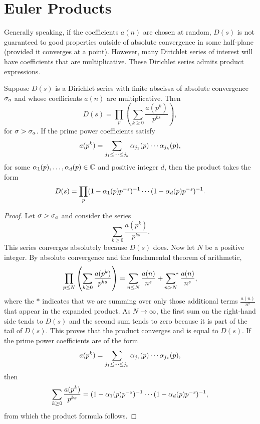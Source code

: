   \section{Euler Products}
    Generally speaking, if the coefficients \(a(n)\) are chosen at random, \(D(s)\) is not guaranteed to good properties outside of absolute convergence in some half-plane (provided it converges at a point). However, many Dirichlet series of interest will have coefficients that are multiplicative. These Dirichlet series admits product expressions.

    \begin{proposition}\label{prop:Dirichlet_series_Euler_product}
      Suppose \(D(s)\) is a Dirichlet series with finite abscissa of absolute convergence \(\sigma_{a}\) and whose coefficients \(a(n)\) are multiplicative. Then
      \[
        D(s) = \prod_{p}\left(\sum_{k \ge 0}\frac{a(p^{k})}{p^{ks}}\right),
      \]
      for \(\sigma > \sigma_{a}\). If the prime power coefficients satisfy
      \[
        a(p^{k}) = \sum_{j_{1} \le \cdots \le j_{k}}\alpha_{j_{1}}(p) \cdots \alpha_{j_{k}}(p),
      \]
      for some \(\alpha_{1}(p),\ldots,\alpha_{d}(p) \in \mathbb{C}\) and positive integer \(d\), then the product takes the form
      \[
        D(s) = \prod_{p}(1-\alpha_{1}(p)p^{-s})^{-1} \cdots (1-\alpha_{d}(p)p^{-s})^{-1}.
      \]
    \end{proposition}
    \begin{proof}
      Let \(\sigma > \sigma_{a}\) and consider the series
      \[
        \sum_{k \ge 0}\frac{a(p^{k})}{p^{ks}}.
      \]
      This series converges absolutely because \(D(s)\) does. Now let \(N\) be a positive integer. By absolute convergence and the fundamental theorem of arithmetic,
      \[
        \prod_{p \le N}\left(\sum_{k \ge 0}\frac{a(p^{k})}{p^{ks}}\right) = \sum_{n \le N}\frac{a(n)}{n^{s}}+\sideset{}{^{\ast}}\sum_{n > N}\frac{a(n)}{n^{s}},
      \]
      where the \(\ast\) indicates that we are summing over only those additional terms \(\frac{a(n)}{n^{s}}\) that appear in the expanded product. As \(N \to \infty\), the first sum on the right-hand side tends to \(D(s)\) and the second sum tends to zero because it is part of the tail of \(D(s)\). This proves that the product converges and is equal to \(D(s)\). If the prime power coefficients are of the form
      \[
        a(p^{k}) = \sum_{j_{1} \le \cdots \le j_{k}}\alpha_{j_{1}}(p) \cdots \alpha_{j_{k}}(p),
      \]
      then
      \[
        \sum_{k \ge 0}\frac{a(p^{k})}{p^{ks}} = (1-\alpha_{1}(p)p^{-s})^{-1} \cdots (1-\alpha_{d}(p)p^{-s})^{-1},
      \]
        from which the product formula follows.
    \end{proof}

